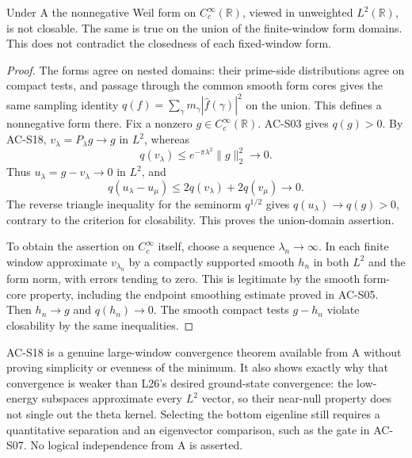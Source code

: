 \begin{corollary}
\label{AC-S19}
Under A the nonnegative Weil form on \(C_c^\infty(\mathbb R)\),
viewed in unweighted \(L^2(\mathbb R)\), is not closable.  The same
is true on the union of the finite-window form domains.  This does
not contradict the closedness of each fixed-window form.
\end{corollary}
\begin{proof}
The forms agree on nested domains: their prime-side distributions
agree on compact tests, and passage through the common smooth form
cores gives the same sampling identity
\(q(f)=\sum_\gamma m_\gamma|\widehat f(\gamma)|^2\)
on the union.  This defines a nonnegative form there.
Fix a nonzero \(g\in C_c^\infty(\mathbb R)\).  AC-S03 gives
\(q(g)>0\).  By AC-S18,
\(v_\lambda=P_\lambda g\to g\) in \(L^2\), whereas
\[
 q(v_\lambda)\leq e^{-\pi\lambda^2}\|g\|_2^2\longrightarrow0.
\]
Thus \(u_\lambda=g-v_\lambda\to0\) in \(L^2\), and
\[
 q(u_\lambda-u_\mu)
       \leq2q(v_\lambda)+2q(v_\mu)\longrightarrow0.
\]
The reverse triangle inequality for the seminorm \(q^{1/2}\)
gives \(q(u_\lambda)\to q(g)>0\), contrary to the criterion for
closability.  This proves the union-domain assertion.

To obtain the assertion on \(C_c^\infty\) itself, choose a sequence
\(\lambda_n\to\infty\).  In each finite window approximate
\(v_{\lambda_n}\) by a compactly supported smooth \(h_n\) in both
\(L^2\) and the form norm, with errors tending to zero.  This is
legitimate by the smooth form-core property, including the endpoint
smoothing estimate proved in AC-S05.  Then \(h_n\to g\) and
\(q(h_n)\to0\).  The smooth compact tests \(g-h_n\) violate
closability by the same inequalities.
\end{proof}

AC-S18 is a genuine large-window convergence theorem available from
A without proving simplicity or evenness of the minimum.  It also
shows exactly why that convergence is weaker than L26's desired
ground-state convergence: the low-energy subspaces approximate every
\(L^2\) vector, so their near-null property does not single out the
theta kernel.  Selecting the bottom eigenline still requires a
quantitative separation and an eigenvector comparison, such as the
gate in AC-S07.  No logical independence from A is asserted.
